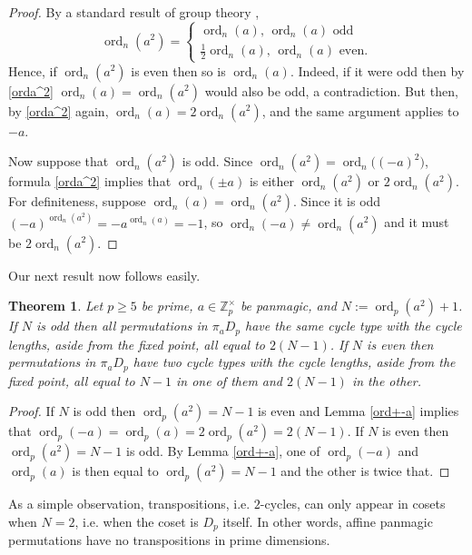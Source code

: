 \documentclass[11pt]{article}
\theoremstyle{plain}
\newtheorem{theorem}{Theorem}
\theoremstyle{definition}
\newcommand{\+}[1]{{#1}^\times}
\DeclareMathOperator{\ord}{ord}
\def\Z{{\mathbb Z}}
\begin{document}
\begin{proof} 
By a standard result of group theory \cite{Gallian}, 
\begin{equation}\label{orda^2} 
\ord_n(a^2)=\begin{cases}\ord_n(a),\,\ord_n(a)\text{ odd}\\\frac12\ord_n(a),\,\ord_n(a)\text{ even.}\end{cases}
\end{equation}
Hence, if $\ord_n(a^2)$ is even then so is $\ord_n(a)$. Indeed, if it were odd then by \eqref{orda^2} $\ord_n( a)=\ord_n(a^2)$ would also be odd, a contradiction. But then, by \eqref{orda^2} again, $\ord_n( a)=2\ord_n(a^2)$, and the same argument applies to $-a$.

Now suppose that $\ord_n(a^2)$ is odd. Since  $\ord_n(a^2)=\ord_n\big((-a)^2\big)$, formula \eqref{orda^2} implies that $\ord_n(\pm a)$ is either $\ord_n(a^2)$ or $2\ord_n(a^2)$. For definiteness, suppose $\ord_n(a)=\ord_n(a^2)$. Since it is odd $(-a)^{\ord_n(a^2)}=- a^{\ord_n(a)}=-1$, so $\ord_n(-a)\neq\ord_n(a^2)$ and it must be $2\ord_n(a^2)$.
\end{proof}
Our next result now follows easily.
\begin{theorem}\label{onecycle} Let $p\geq5$ be prime, $a\in\Z_p^{\times}$ be panmagic, and $N:=\ord_p(a^2)+1$. If $N$ is odd then all permutations in $\pi_aD_p$ have the same cycle type with the cycle lengths, aside from the fixed point, all equal to $2(N-1)$. If $N$ is even then permutations in $\pi_aD_p$ have two cycle types with the cycle lengths, aside from the fixed point, all equal to $N-1$ in one of them and $2(N-1)$ in the other.
\end{theorem}
\begin{proof} If $N$ is odd then $\ord_p(a^2)=N-1$ is even and Lemma \ref{ord+-a} implies that $\ord_p(-a)=\ord_p(a)=2\ord_p(a^2)=2(N-1)$. If  $N$ is even then $\ord_p(a^2)=N-1$ is odd. By Lemma \ref{ord+-a}, one of $\ord_p(-a)$ and $\ord_p(a)$ is then equal to $\ord_p(a^2)=N-1$ and the other is twice that.
\end{proof}
\noindent As a simple observation, transpositions, i.e. $2$-cycles, can only appear in cosets when $N=2$, i.e. when the coset is $D_p$ itself. In other words, affine panmagic permutations have no transpositions in prime dimensions. 
\end{document}
